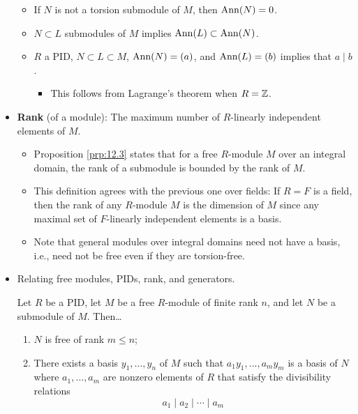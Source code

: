 \documentclass[../notes.tex]{subfiles}
\begin{document}
\begin{itemize}
\begin{equation*}
    \end{equation*}
    \begin{itemize}
        \item If $N$ is not a torsion submodule of $M$, then $\operatorname{Ann}(N)=0$.
        \item $N\subset L$ submodules of $M$ implies $\operatorname{Ann}(L)\subset\operatorname{Ann}(N)$.
        \item $R$ a PID, $N\subset L\subset M$, $\operatorname{Ann}(N)=(a)$, and $\operatorname{Ann}(L)=(b)$ implies that $a\mid b$.
        \begin{itemize}
            \item This follows from Lagrange's theorem when $R=\mathbb{Z}$.
        \end{itemize}
    \end{itemize}
    \item \textbf{Rank} (of a module): The maximum number of $R$-linearly independent elements of $M$.
    \begin{itemize}
        \item Proposition \ref{prp:12.3} states that for a free $R$-module $M$ over an integral domain, the rank of a submodule is bounded by the rank of $M$.
        \item This definition agrees with the previous one over fields: If $R=F$ is a field, then the rank of any $R$-module $M$ is the dimension of $M$ since any maximal set of $F$-linearly independent elements is a basis.
        \item Note that general modules over integral domains need not have a basis, i.e., need not be free even if they are torsion-free.
    \end{itemize}
    \item Relating free modules, PIDs, rank, and generators.
    \begin{theorem}\label{trm:12.4}
        Let $R$ be a PID, let $M$ be a free $R$-module of finite rank $n$, and let $N$ be a submodule of $M$. Then\dots
        \begin{enumerate}
            \item $N$ is free of rank $m\leq n$;
            \item There exists a basis $y_1,\dots,y_n$ of $M$ such that $a_1y_1,\dots,a_my_m$ is a basis of $N$ where $a_1,\dots,a_m$ are nonzero elements of $R$ that satisfy the divisibility relations
            \begin{equation*}
                a_1\mid a_2\mid\cdots\mid a_m
            \end{equation*}
        \end{enumerate}

\end{theorem}
\end{itemize}
\end{document}
